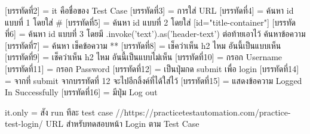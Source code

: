  [บรรทัดที่2] = it คือชื่อของ Test Case
 [บรรทัดที่3] = การใส่ URL
 [บรรทัดที่4] = ค้นหา id แบบที่ 1 โดยใส่ #
 [บรรทัดที่5] = ค้นหา id แบบที่ 2 โดยใส่ [id="title-container"]
 [บรรทัดที่6] = ค้นหา id แบบที่ 3 โดยมี .invoke('text').as('header-text') ต่อท้ายเอาไว้ ค้นหาข้อความ
 [บรรทัดที่7] = ค้นหา เช็คข้อความ **
 [บรรทัดที่8] = เช็คว่าเห็น h2 ไหม อันนี้เป็นแบบเห็น
 [บรรทัดที่9] = เช็คว่าเห็น h2 ไหม อันนี้เป็นแบบไม่เห็น
 [บรรทัดที่10] = กรอก Username
 [บรรทัดที่11] = กรอก Password
 [บรรทัดที่12] = เป็นปุ่มกด submit เพื่อ login
 [บรรทัดที่14] = จากที่ submit จากบรรทัดที่ 12 จะไปอีกลิ้งค์ที่ได้ใส่ไว้
 [บรรทัดที่15] = แสดงข้อความ Logged In Successfully
 [บรรทัดที่16] = มีปุ่ม Log out 


 it.only = สัง run ทีละ test case
//https://practicetestautomation.com/practice-test-login/  URL สำหรับทดสอบหน้า Login ตาม Test Case